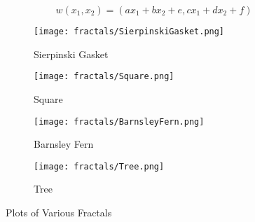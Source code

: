 \begin{equation}
w(x_1 , x_2) = ( a x_1 + b x_2 + e, c x_1 + d x_2 + f )
\end{equation} \label{affine_transformation}

\begin{figure}[tbh]
\begin{center}
	\begin{subfigure}[tbh]{0.475\textwidth}
	\begin{center}
	\texttt{[image: fractals/SierpinskiGasket.png]}
	\caption{ Sierpinski Gasket }
	\end{center}
	\end{subfigure}
\hfill
	\begin{subfigure}[tbh]{0.475\textwidth}
	\begin{center}
	\texttt{[image: fractals/Square.png]}
	\caption{ Square }
	\end{center}
	\end{subfigure}
\hfill
	\begin{subfigure}[tbh]{0.475\textwidth}
	\begin{center}
	\texttt{[image: fractals/BarnsleyFern.png]}
	\caption{ Barnsley Fern }
	\end{center}
	\end{subfigure}
\hfill
	\begin{subfigure}[tbh]{0.475\textwidth}
	\begin{center}
	\texttt{[image: fractals/Tree.png]}
	\caption{ Tree }
	\end{center}
	\end{subfigure}
\hfill

\end{center}
\caption{Plots of Various Fractals \label{fractals} }
\end{figure}

